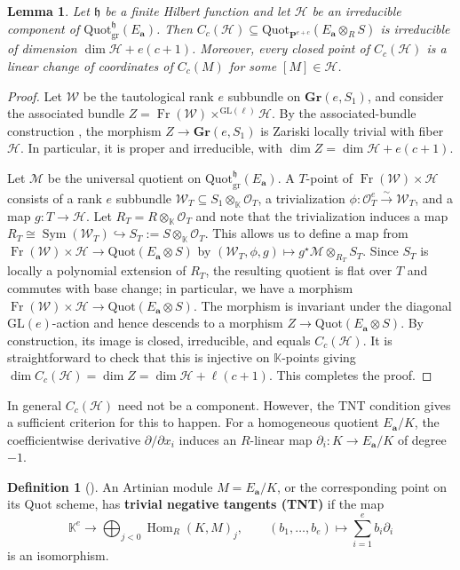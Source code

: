 \documentclass[leqno,11pt,a4paper]{amsart}
\newtheorem{lemma}[lemma]{Lemma}
\theoremstyle{definition}
\newtheorem{definition}[definition]{Definition}
\numberwithin{equation}{section}
\newcommand{\Gr}{\mathbf{Gr}}
\newcommand{\kk}{\mathbb{K}}
\newcommand{\bfa}{\mathbf{a}}
\newcommand{\GL}{\mathrm{GL}}
\newcommand{\Quot}{\mathrm{Quot}}
\newcommand{\PP}{\mathbf{P}}
\newcommand{\mfh}{\mathfrak{h}}
\newcommand{\OO}{\mathscr{O}}
\newcommand{\MM}{\mathscr{M}}
\newcommand{\HH}{\mathcal{H}}
\DeclareMathOperator{\Hom}{Hom}
\DeclareMathOperator{\Fr}{Fr}
\DeclareMathOperator{\Sym}{Sym}
\begin{document}
\begin{lemma} \label{dimension_cone_comp}
Let $\mfh$ be a finite Hilbert function and let $\HH$ be an irreducible component of $\Quot_{\mathrm{gr}}^{\mfh}(E_{\bfa})$. 
Then $C_c(\HH) \subseteq \Quot_{\PP^{e+c}}(E_\bfa\otimes_R S)$ is irreducible of dimension $\dim\HH+e(c+1)$.
Moreover, every closed point of $C_c(\HH)$ is a linear change of coordinates of $C_c(M)$ for some $[M]\in\HH$.
\end{lemma}
\begin{proof} 
Let $\mathscr{W}$ be the tautological rank $e$ subbundle on $\Gr(e,S_1)$, and consider the associated bundle $Z = \Fr(\mathscr{W}) \times^{\GL(\ell)} \HH$.
By the associated-bundle construction \cite[Section 4.7]{BKS25}, the morphism $Z\to \Gr(e,S_1)$ is Zariski locally trivial with fiber $\HH$. 
In particular, it is proper and irreducible, with $ \dim Z=\dim \HH+e(c+1)$.

Let $\MM$ be the universal quotient on $\Quot^\mfh_{\text{gr}}(E_\bfa)$.
A $T$-point of $\Fr(\mathscr{W}) \times \HH$ consists of a rank $e$ subbundle
$\mathscr{W}_T \subseteq S_1\otimes_\kk \OO_T$, a trivialization $\phi:\OO_T^e \xrightarrow{\sim}\mathscr{W}_T$, and a map $g:T \to \HH$.
Let $R_T=R\otimes_\kk\OO_T$ and note that the trivialization induces a map $R_T\cong\Sym(\mathscr W_T)\hookrightarrow S_T := S \otimes_\kk \OO_T$.
This allows us to define a map from $\Fr(\mathscr{W}) \times \HH \to \Quot(E_\bfa \otimes S)$ by
$(\mathscr{W}_T,\phi,g) \mapsto g^{\star}\MM \otimes_{R_T}S_T$.
Since $S_T$ is locally a polynomial extension of $R_T$, the resulting quotient is flat over $T$ and commutes with base change; in particular, we have a morphism $\Fr(\mathscr{W}) \times \HH \to \Quot(E_\bfa \otimes S)$. 
The morphism is invariant under the diagonal $\GL(e)$-action and hence descends to a morphism $Z \to \Quot(E_\bfa \otimes S)$. 
By construction, its image is closed, irreducible, and equals $C_c(\mathcal H)$. 
It is straightforward to check that this is injective on $\kk$-points giving $ \dim C_c(\mathcal H)=\dim Z =\dim\mathcal H+\ell(c+1)$. 
This completes the proof.
\end{proof}

In general $C_c(\HH)$ need not be a component.
However, the TNT condition gives a sufficient criterion for this to happen.
For a homogeneous quotient $E_\bfa/K$, the coefficientwise derivative $\partial/\partial x_i$ induces an $R$-linear map $\partial_i: K \to E_\bfa/K$ of degree $-1$.

\begin{definition}[{\cite[\S5]{jelisiejew_sivic}}] \label{module_TNT} 
An Artinian module $M = E_\bfa/K$, or the corresponding point on its Quot scheme, has \textbf{trivial negative tangents (TNT)} if the map
$$
\kk^e\longrightarrow\bigoplus_{j<0}\Hom_R(K,M)_j,
\qquad (b_1,\ldots,b_e) \mapsto \sum_{i=1}^e b_i\partial_i
$$
is an isomorphism.
\end{definition}
\end{document}
